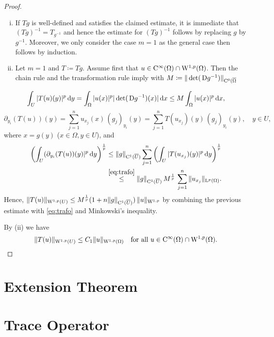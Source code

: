 \begin{proof}
  \begin{enumerate}[(i)]
    \item If $Tg$ is well-defined and satisfies the claimed estimate, it is immediate that $(Tg)^{-1} = T_{g^{-1}}$ and hence the estimate for $(Tg)^{-1}$ follows by replacing $g$ by $g^{-1}$.
      Moreover, we only consider the case $m = 1$ as the general case then follows by induction.
    \item Let $m = 1$ and $T \coloneqq Tg$.
      Assume first that $u \in \mathrm{C}^\infty(\Omega) \cap \mathrm{W}^{1,p}(\Omega)$.
      Then the chain rule and the transformation rule imply with $M \coloneqq \|\det(\,{\operatorname{D}} g^{-1})\|_{\mathrm{C}^0(\overline{\Omega}}$
  \end{enumerate}
  \begin{equation}
    \label{eq:trafo}
    \int_U |T(u)(y)|^p \, {\operatorname{d}\!{y}}
     = \int_\Omega |u(x)|^p |\det(\,{\operatorname{D}} g^{-1})(x)| \, {\operatorname{d}\!{x}}
    \leq M \int_\Omega |u(x)|^p \, {\operatorname{d}\!{x}},
  \end{equation}
  $$
  \partial_{y_i} (T(u))(y)
  = \sum_{j = 1}^n u_{x_j}(x) \, (g_j)_{y_i}(y)
  = \sum_{j = 1}^n T(u_{x_j})(y) \, (g_j)_{y_i}(y), \quad y \in U,
  $$
  where $x = g(y)$ ($x \in \Omega, y \in U$), and
  \begin{align*}
    \left( \int_U (\partial_{y_i}(T(u))(y)|^p \, {\operatorname{d}\!{y}}\right)^{\frac{1}{p}}
    & \leq \|g\|_{\mathrm{C}^1(\overline U)} \sum_{j = 1}^n \left( \int_U |T(u_{x_j})(y)|^p \, {\operatorname{d}\!{y}} \right)^{\frac{1}{p}} \\
    & \overset{\eqref{eq:trafo}}{\leq} \|g\|_{\mathrm{C}^1(\overline U)} \, M^{\frac{1}{p}} \, \sum_{j = 1}^n \|u_{x_j} \|_{\mathrm{L}^p(\Omega)}.
  \end{align*}
  Hence, $\|T(u)\|_{\mathrm{W}^{1,p}(U)} \leq M^{\frac{1}{p}} (1 + n\|g\|_{\mathrm{C}^1(\overline U)}) \, \|u\|_{\mathrm{W}^{1,p}}$ by combining the previous estimate with \eqref{eq:trafo} and Minkowski's inequality.
\item By (ii) we have
  $$
  \|T(u)\|_{\mathrm{W}^{1,p}(U)} \leq C_1 \|u\|_{\mathrm{W}^{1,p}(\Omega)} \quad \text{for all } u \in \mathrm{C}^\infty(\Omega) \cap \mathrm{W}^{1,p}(\Omega).
  $$
\end{proof}

\section{Extension Theorem}

\section{Trace Operator}
